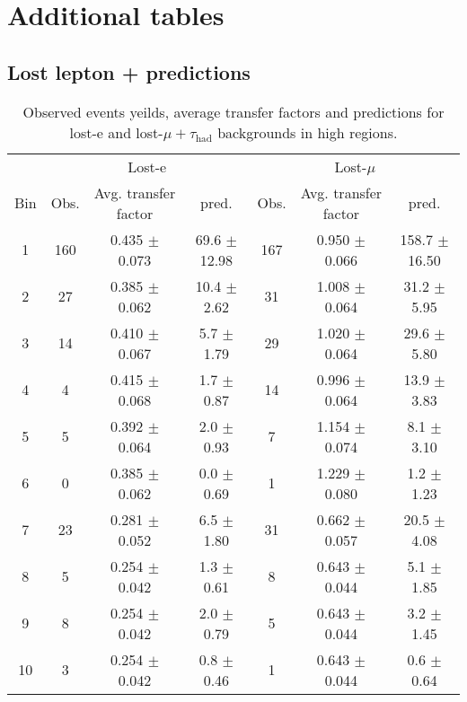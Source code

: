 \chapter{Additional tables} %

\label{AppendixB}
\section{Lost lepton + \tauh predictions}
\begin{table}[h!]
\centering
\caption{Observed events yeilds, average transfer factors and predictions for lost-e and 
lost-$\mu+\tau_{\text{had}}$ backgrounds in high \dphi regions.}
\label{tab:lostLeptonPredictions}
\begin{tabular}{c|c|c|c|c|c|c}
\hline
     &  \multicolumn{3}{c}{Lost-e} & \multicolumn{3}{c}{Lost-$\mu$} \\\cline{2-7}
Bin & Obs. & Avg. transfer factor & pred. & Obs. & Avg. transfer factor &  pred. \\ 
\hline \hline
1 & 160  & 0.435  $\pm$  0.073  & 69.6 $\pm$ 12.98 & 167  & 0.950  $\pm$  0.066  & 158.7 $\pm$ 16.50    \\\hline
2 & 27  & 0.385  $\pm$  0.062  & 10.4 $\pm$ 2.62 & 31  & 1.008  $\pm$  0.064  & 31.2 $\pm$ 5.95    \\\hline
3 & 14  & 0.410  $\pm$  0.067  & 5.7 $\pm$ 1.79 & 29  & 1.020  $\pm$  0.064  & 29.6 $\pm$ 5.80    \\\hline
4 & 4  & 0.415  $\pm$  0.068  & 1.7 $\pm$ 0.87 & 14  & 0.996  $\pm$  0.064  & 13.9 $\pm$ 3.83    \\\hline
5 & 5  & 0.392  $\pm$  0.064  & 2.0 $\pm$ 0.93 & 7  & 1.154  $\pm$  0.074  & 8.1 $\pm$ 3.10    \\\hline
6 & 0  & 0.385  $\pm$  0.062  & 0.0 $\pm$ 0.69 & 1  & 1.229  $\pm$  0.080  & 1.2 $\pm$ 1.23    \\\hline
7 & 23  & 0.281  $\pm$  0.052  & 6.5 $\pm$ 1.80 & 31  & 0.662  $\pm$  0.057  & 20.5 $\pm$ 4.08    \\\hline
8 & 5  & 0.254  $\pm$  0.042  & 1.3 $\pm$ 0.61 & 8  & 0.643  $\pm$  0.044  & 5.1 $\pm$ 1.85    \\\hline
9 & 8  & 0.254  $\pm$  0.042  & 2.0 $\pm$ 0.79 & 5  & 0.643  $\pm$  0.044  & 3.2 $\pm$ 1.45    \\\hline
10 & 3  & 0.254  $\pm$  0.042  & 0.8 $\pm$ 0.46 & 1  & 0.643  $\pm$  0.044  & 0.6 $\pm$ 0.64    \\\hline

\end{tabular}
\end{table}
